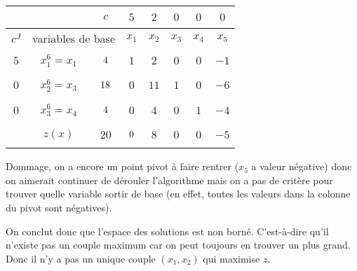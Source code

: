 \begin{td-sol}[]
\begin{enumerate}
        \becomes{}
        \begin{center}
            \begin{tabular}{|ccc|ccccc|} %
                \hline  %
                & \ &\(c\)&\(5\)&\(2\)&\(0\)&\(0\)&\(0\)\\
                \hline %
                \multicolumn{1}{|c|}{\(c^J\)}& \multicolumn{2}{c|}{variables de base}&\(x_1\)&\(x_2\)&\(x_3\)&\(x_4\)&\(x_5\)\\
                \hline %
                \multicolumn{1}{|c|}{\(5\)}& \multicolumn{1}{c|}{\(x_1^{6}=x_1\)} &\(\vphantom{\dfrac16}4\)&\(1\)&\(2\)&\(0\)&\(0\)&\(-1\)\\
                \hline %
                \multicolumn{1}{|c|}{\(0\)}& \multicolumn{1}{c|}{\(x_2^{6}=x_3\)} &\(\vphantom{\dfrac16}18\)&\(0\)&\(11\)&\(1\)&\(0\)&\(-6\)\\
                \hline %
                \multicolumn{1}{|c|}{\(0\)}& \multicolumn{1}{c|}{\(x_3^{6}=x_4\)} &\(\vphantom{\dfrac16}4\)&\(0\)&\(4\)&\(0\)&\(1\)&\(-4\)\\
                \hline %
                \multicolumn{1}{|c|}{} &\(z(x)\)& \multicolumn{1}{|c|}{\(20\)} &\(\vphantom{\dfrac16}0\)&\(8\)&\(0\)&\(0\)&\(-5\)\\
                \hline %
            \end{tabular}
        \end{center}
        Dommage, on a encore un point pivot à faire rentrer (\(x_5\) a 
        valeur négative) donc on aimerait continuer de dérouler l'algorithme
        mais on a pas de critère pour trouver quelle variable sortir de base
        (en effet, toutes les valeurs dans la colonne du pivot sont négatives).
        
        On conclut donc que l'espace des solutions est non borné.
        C'est-à-dire qu'il n'existe pas \og{}un couple maximum\fg{}
        car on peut toujours en trouver un plus grand. Donc
        il n'y a pas un unique couple \((x_1, x_2)\) qui maximise \(z\).

    \end{enumerate}
\end{td-sol}

